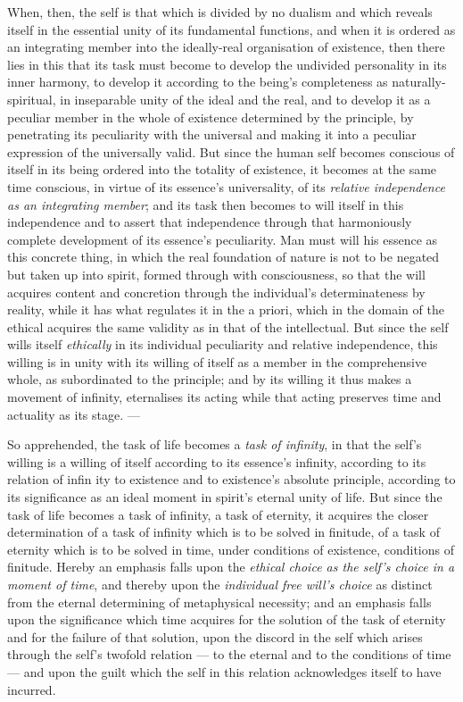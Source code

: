 \documentclass[12pt,a4paper]{book}
\begin{document}
When, then, the self is that which is divided by no dualism and which reveals
itself in the essential unity of its fundamental functions, and when it is
ordered as an integrating member into the ideally-real organisation of
existence, then there lies in this that its task must become to develop the
undivided personality in its inner harmony, to develop it according to the
being's completeness as naturally-spiritual, in inseparable unity of the ideal
and the real, and to develop it as a peculiar member in the whole of existence
determined by the principle, by penetrating its peculiarity with the universal
and making it into a peculiar expression of the universally valid. But since
the human self becomes conscious of itself in its being ordered into the
totality of existence, it becomes at the same time conscious, in virtue of its
essence's universality, of its \emph{relative independence as an integrating
member}; and its task then becomes to will itself in this independence and to
assert that independence through that harmoniously complete development of its
essence's peculiarity. Man must will his essence as this concrete thing, in
which the real foundation of nature is not to be negated but taken up into
spirit, formed through with consciousness, so that the will acquires content
and concretion through the individual's determinateness by reality, while it
has what regulates it in the a priori, which in the domain of the ethical
acquires the same validity as in that of the intellectual. But since the self
wills itself \emph{ethically} in its individual peculiarity and relative
independence, this willing is in unity with its willing of itself as a member
in the comprehensive whole, as subordinated to the principle; and by its
willing it thus makes a movement of infinity, eternalises its acting while
that acting preserves time and actuality as its stage. ---

So apprehended, the task of life becomes a \emph{task of infinity}, in that
the self's willing is a willing of itself according to its essence's infinity,
according to its relation of infin\-%
ity to existence and to existence's absolute principle, according to its
significance as an ideal moment in spirit's eternal unity of life. But since
the task of life becomes a task of infinity, a task of eternity, it acquires
the closer determination of a task of infinity which is to be solved in
finitude, of a task of eternity which is to be solved in time, under conditions
of existence, conditions of finitude. Hereby an emphasis falls upon the
\emph{ethical choice as the self's choice in a moment of time}, and thereby
upon the \emph{individual free will's choice} as distinct from the eternal
determining of metaphysical necessity; and an emphasis falls upon the
significance which time acquires for the solution of the task of eternity and
for the failure of that solution, upon the discord in the self which arises
through the self's twofold relation --- to the eternal and to the conditions
of time --- and upon the guilt which the self in this relation acknowledges
itself to have incurred.
\end{document}
